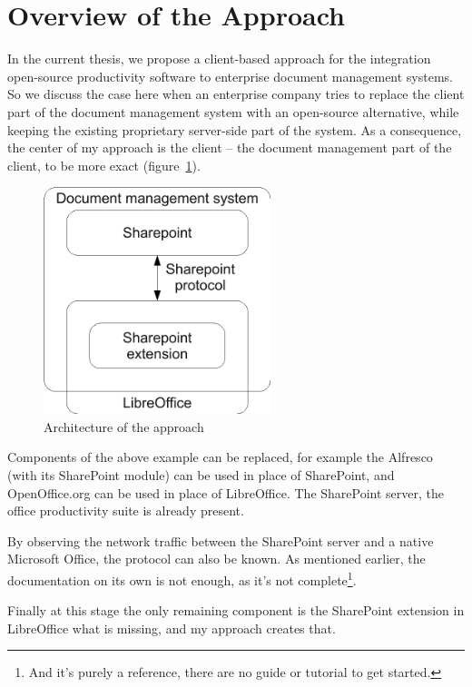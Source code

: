 \section{Overview of the Approach}

In the current thesis, we propose a client-based approach for the integration
open-source productivity software to enterprise document management systems. So
we discuss the case here when an enterprise company tries to replace the client
part of the document management system with an open-source alternative, while
keeping the existing proprietary server-side part of the system. As a
consequence, the center of my approach is the client -- the document management
part of the client, to be more exact (figure~\ref{fig:overview-architecture}).

\begin{figure}[H]
\centering
\includegraphics[width=250px,keepaspectratio]{overview-architecture.pdf}
\caption{Architecture of the approach}
\label{fig:overview-architecture}
\end{figure}

Components of the above example can be replaced, for example the Alfresco (with
its SharePoint module) can be used in place of SharePoint, and OpenOffice.org
can be used in place of LibreOffice. The SharePoint server, the office
productivity suite is already present.

By observing the network traffic between the SharePoint server and a native
Microsoft Office, the protocol can also be known. As mentioned earlier, the
documentation on its own is not enough, as it's not complete\footnote{And it's
purely a reference, there are no guide or tutorial to get started.}.

Finally at this stage the only remaining component is the SharePoint extension
in LibreOffice what is missing, and my approach creates that.

